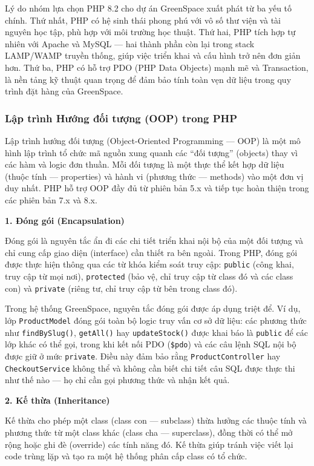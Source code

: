 \documentclass[11pt, a4paper]{article}
\begin{document}
Lý do nhóm lựa chọn PHP 8.2 cho dự án GreenSpace xuất phát từ ba yếu tố chính. Thứ nhất, PHP có hệ sinh thái phong phú với vô số thư viện và tài nguyên học tập, phù hợp với môi trường học thuật. Thứ hai, PHP tích hợp tự nhiên với Apache và MySQL --- hai thành phần còn lại trong stack LAMP/WAMP truyền thống, giúp việc triển khai và cấu hình trở nên đơn giản hơn. Thứ ba, PHP có hỗ trợ PDO (PHP Data Objects) mạnh mẽ và Transaction, là nền tảng kỹ thuật quan trọng để đảm bảo tính toàn vẹn dữ liệu trong quy trình đặt hàng của GreenSpace.

\subsubsection{Lập trình Hướng đối tượng (OOP) trong PHP}

Lập trình hướng đối tượng (Object-Oriented Programming --- OOP) là một mô hình lập trình tổ chức mã nguồn xung quanh các ``đối tượng'' (objects) thay vì các hàm và logic đơn thuần. Mỗi đối tượng là một thực thể kết hợp dữ liệu (thuộc tính --- properties) và hành vi (phương thức --- methods) vào một đơn vị duy nhất. PHP hỗ trợ OOP đầy đủ từ phiên bản 5.x và tiếp tục hoàn thiện trong các phiên bản 7.x và 8.x.

\textbf{1. Đóng gói (Encapsulation)}

Đóng gói là nguyên tắc ẩn đi các chi tiết triển khai nội bộ của một đối tượng và chỉ cung cấp giao diện (interface) cần thiết ra bên ngoài. Trong PHP, đóng gói được thực hiện thông qua các từ khóa kiểm soát truy cập: \texttt{public} (công khai, truy cập từ mọi nơi), \texttt{protected} (bảo vệ, chỉ truy cập từ class đó và các class con) và \texttt{private} (riêng tư, chỉ truy cập từ bên trong class đó).

Trong hệ thống GreenSpace, nguyên tắc đóng gói được áp dụng triệt để. Ví dụ, lớp \texttt{ProductModel} đóng gói toàn bộ logic truy vấn cơ sở dữ liệu: các phương thức như \texttt{findBySlug()}, \texttt{getAll()} hay \texttt{updateStock()} được khai báo là \texttt{public} để các lớp khác có thể gọi, trong khi kết nối PDO (\texttt{\$pdo}) và các câu lệnh SQL nội bộ được giữ ở mức \texttt{private}. Điều này đảm bảo rằng \texttt{ProductController} hay \texttt{CheckoutService} không thể và không cần biết chi tiết câu SQL được thực thi như thế nào --- họ chỉ cần gọi phương thức và nhận kết quả.

\textbf{2. Kế thừa (Inheritance)}

Kế thừa cho phép một class (class con --- subclass) thừa hưởng các thuộc tính và phương thức từ một class khác (class cha --- superclass), đồng thời có thể mở rộng hoặc ghi đè (override) các tính năng đó. Kế thừa giúp tránh việc viết lại code trùng lặp và tạo ra một hệ thống phân cấp class có tổ chức.
\end{document}
